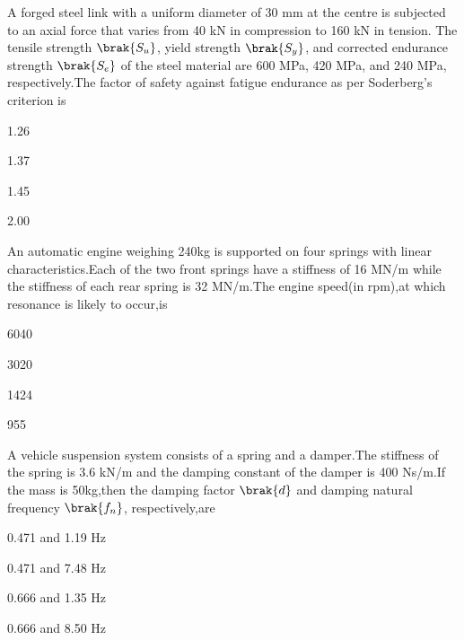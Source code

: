 \iffalse
\chapter{2009}
\author{ai24btech11035}
\section{me}
\fi
	\item A forged steel link with a uniform diameter of 30 mm at the centre is subjected to an axial force that varies from 40 kN in compression to 160 kN in tension. The tensile strength $\brak{S_u}$, yield strength $\brak{S_y}$, and corrected endurance strength $\brak{S_e}$ of the steel material are 600 MPa, 420 MPa, and 240 MPa, respectively.The factor of safety against fatigue endurance as per Soderberg's criterion is
\begin{enumerate}
\begin{multicols}{2}
\item 1.26
\item 1.37
\item 1.45
\item 2.00
\end{multicols}
\end{enumerate}
\item An automatic engine weighing 240kg is supported on four springs with linear characteristics.Each of the two front springs have a stiffness of 16 MN/m while the stiffness of each rear spring is 32 MN/m.The engine speed(in rpm),at which resonance is likely to occur,is
\begin{enumerate}
\begin{multicols}{4}
\item 6040
\item 3020
\item 1424
\item 955
\end{multicols}
\end{enumerate}
\item A vehicle suspension system consists of a spring and a damper.The stiffness of the spring is 3.6 kN/m and the damping constant of the damper is 400 Ns/m.If the mass is 50kg,then the damping factor $\brak{d}$ and damping natural frequency $\brak{f_n}$, respectively,are
\begin{enumerate}
\begin{multicols}{2}
\item  0.471 and 1.19 Hz
\item  0.471 and 7.48 Hz
\item  0.666 and 1.35 Hz
\item  0.666 and 8.50 Hz
\end{multicols}
\end{enumerate}
